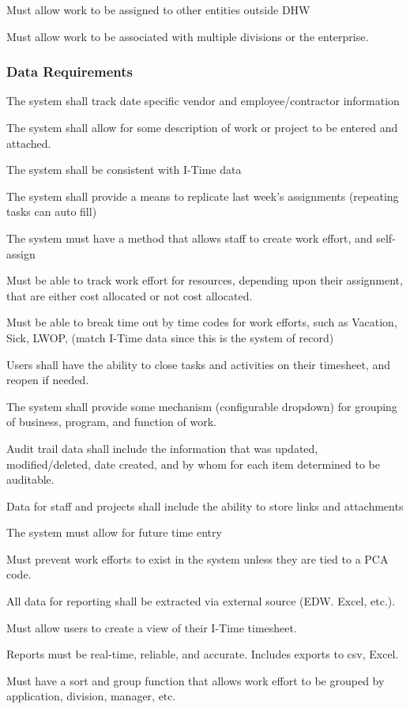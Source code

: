 Must allow work to be assigned to other entities outside DHW

Must allow work to be associated with multiple divisions or the enterprise.

\subsubsection{Data Requirements}
The system shall track date specific vendor and employee/contractor information

The system shall allow for some description of work or project to be entered and attached.

The system shall be consistent with I-Time data

The system shall provide a means to replicate last week's assignments (repeating tasks can auto fill)

The system must have a method that allows staff to create work effort, and self-assign

Must be able to track work effort for resources, depending upon their assignment, that are either cost allocated or not cost allocated.

Must be able to break time out by time codes for work efforts, such as Vacation, Sick, LWOP, (match I-Time data since this is the system of record)

Users shall have the ability to close tasks and activities on their timesheet, and reopen if needed.

The system shall provide some mechanism (configurable dropdown) for  grouping of business, program, and function of work.

Audit trail data shall include the information that was updated, modified/deleted, date created, and by whom for each item determined to be auditable.

Data for staff and projects shall include the ability to store links and attachments

The system must allow for future time entry

Must prevent work efforts to exist in the system unless they are tied to a PCA code.

All data for reporting shall be extracted via external source (EDW. Excel, etc.).

Must allow users to create a view of their I-Time timesheet. 

Reports must be real-time, reliable, and accurate. Includes exports to csv, Excel. 

Must have a sort and group function that allows work effort to be grouped by application, division, manager, etc.

